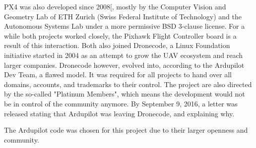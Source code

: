 PX4 was also developed since 2008[\cite{waybackmachine}, mostly by the Computer Vision and Geometry Lab of ETH Zurich (Swiss Federal Institute of Technology)\cite{computervision} and the Autonomous Systems Lab\cite{autonomouslab} under a more permissive BSD 3-clause license\cite{bsd}.
%
For a while both projects worked closely, the Pixhawk Flight Controller board is a result of this interaction.
%
Both also joined Dronecode\cite{dronecode}, a Linux Foundation\cite{linuxfoundation} initiative started in 2004 as an attempt to grow the UAV ecosystem and reach larger companies.
%
%
Dronecode however, evolved into, according to the Ardupilot Dev Team, a flawed model.
%
It was required for all projects to hand over all domains, accounts, and trademarks to their control.
%
The project are also directed by the so-called "Platinum Members", which means the development would not be in control of the community anymore.
%
By September 9, 2016, a letter was released stating that Ardupilot was leaving Dronecode, and explaining why\cite{letter}.

The Ardupilot code was chosen for this project due to their larger openness and community.

